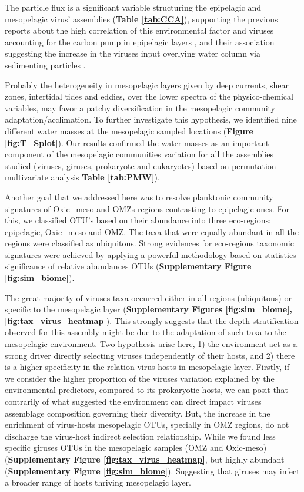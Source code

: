 \documentclass[fleqn,10pt]{wlscirep}
\begin{document}
The particle flux is a significant variable structuring the epipelagic and mesopelagic virus’ assemblies (\textbf{Table \ref{tab:CCA}}), supporting the previous reports about the high correlation of this environmental factor and viruses accounting for the carbon pump in epipelagic layers \cite{guidi_plankton_2016}, and their association suggesting the increase in the viruses input overlying water column via sedimenting particles \cite{parada_viral_2007}.

Probably the heterogeneity in mesopelagic layers given by deep currents, shear zones, intertidal tides and eddies, over the lower spectra of the physico-chemical variables, may favor a patchy diversification in the mesopelagic community adaptation/acclimation. To further investigate this hypothesis, we identified nine different water masses at the mesopelagic sampled locations (\textbf{Figure \ref{fig:T_Splot}}). Our results confirmed the water masses as an important component of the mesopelagic communities variation for all the assemblies studied (viruses, giruses, prokaryote and eukaryotes) based on permutation multivariate analysis \textbf{Table \ref{tab:PMW}}).

Another goal that we addressed here was to resolve planktonic community signatures of Oxic\_meso and OMZs regions contrasting to epipelagic ones. For this, we classified OTU’s based on their abundance into three eco-regions: epipelagic, Oxic\_meso and OMZ. The taxa that were equally abundant in all the regions were classified as ubiquitous. Strong evidences for eco-regions taxonomic signatures were achieved by applying a powerful methodology based on statistics significance of relative abundances OTUs (\textbf{Supplementary Figure \ref{fig:sim_biome}}).

The great majority of viruses taxa occurred either in all regions (ubiquitous) or specific to the mesopelagic layer (\textbf{Supplementary Figures \ref{fig:sim_biome}, \ref{fig:tax_virus_heatmap}}). This strongly suggests that the depth stratification observed for this assembly might be due to the adaptation of such taxa to the mesopelagic environment. Two hypothesis arise here, 1) the environment act as a strong driver directly selecting viruses independently of their hosts, and 2) there is a higher specificity in the relation virus-hosts in mesopelagic layer. Firstly, if we consider the higher proportion of the viruses variation explained by the environmental predictors, compared to its prokaryotic hosts, we can posit that contrarily of what suggested the environment can direct impact viruses assemblage composition governing their diversity. But, the increase in the  enrichment of virus-hosts mesopelagic OTUs, specially in OMZ regions, do not discharge the virus-host indirect selection relationship.
While we found less specific giruses OTUs in the mesopelagic samples (OMZ and Oxic-meso) (\textbf{Supplementary Figure \ref{fig:tax_virus_heatmap}}, but highly abundant  (\textbf{Supplementary Figure \ref{fig:sim_biome}}). Suggesting that giruses may infect a broader range of hosts thriving mesopelagic layer.
\end{document}
